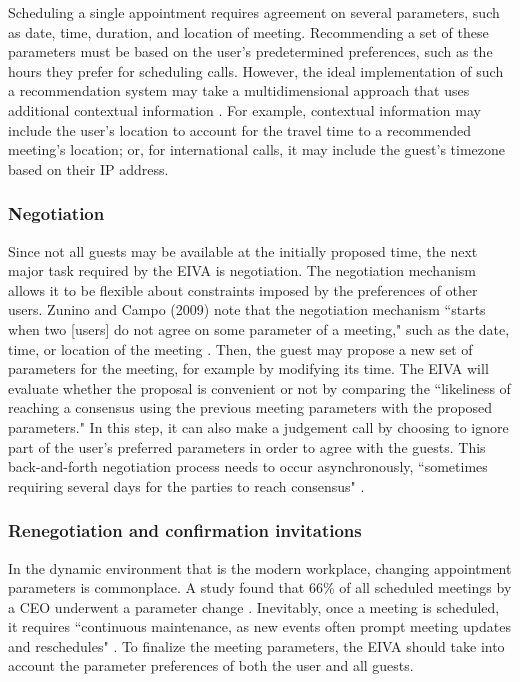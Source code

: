 \documentclass{article}
\begin{document}
Scheduling a single appointment requires agreement on several parameters, such as date, time, duration, and location of meeting. Recommending a set of these parameters must be based on the user's predetermined preferences, such as the hours they prefer for scheduling calls. However, the ideal implementation of such a recommendation system may take a multidimensional approach that uses additional contextual information \cite{adomavicius_incorporating_2005}. For example, contextual information may include the user's location to account for the travel time to a recommended meeting's location; or, for international calls, it may include the guest's timezone based on their IP address.

\subsubsection{Negotiation}

Since not all guests may be available at the initially proposed time, the next major task required by the EIVA is negotiation. The negotiation mechanism allows it to be flexible about constraints imposed by the preferences of other users. Zunino and Campo (2009) note that the negotiation mechanism ``starts when two [users] do not agree on some parameter of a meeting," such as the date, time, or location of the meeting \cite{zunino_chronos_2009}. Then, the guest may propose a new set of parameters for the meeting, for example by modifying its time. The EIVA will evaluate whether the proposal is convenient or not by comparing the ``likeliness of reaching a consensus using the previous meeting parameters with the proposed parameters." In this step, it can also make a judgement call by choosing to ignore part of the user's preferred parameters in order to agree with the guests. This back-and-forth negotiation process needs to occur asynchronously, ``sometimes requiring several days for the parties to reach consensus" \cite{cranshaw_calendarhelp_2017}.

\subsubsection{Renegotiation and confirmation invitations}

In the dynamic environment that is the modern workplace, changing appointment parameters is commonplace. A study found that 66\% of all scheduled meetings by a CEO underwent a parameter change \cite{dennis_how_2018}. Inevitably, once a meeting is scheduled, it requires ``continuous maintenance, as new events often prompt meeting updates and reschedules" \cite{cranshaw_calendarhelp_2017}. To finalize the meeting parameters, the EIVA should take into account the parameter preferences of both the user and all guests.
\end{document}
